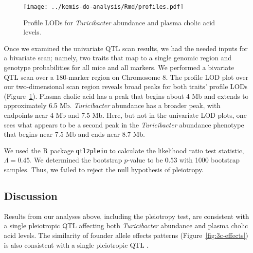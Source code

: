 \documentclass[oneside]{book}\usepackage[]{graphicx}\usepackage[]{color}
\begin{document}

\begin{figure}
\texttt{[image: ../kemis-do-analysis/Rmd/profiles.pdf]}
\caption{Profile LODs for \emph{Turicibacter} abundance and plasma cholic acid levels.}\label{fig:3c-profile}
\end{figure}

Once we examined the univariate QTL scan results, 
we had the needed inputs for a bivariate scan; namely, two traits that map to a single 
genomic region and genotype probabilities for all mice and all markers. 
We performed a bivariate QTL scan over a 180-marker region on Chromosome 8. 
The profile LOD plot over our two-dimensional scan region reveals broad peaks
for both traits' profile LODs (Figure~\ref{fig:3c-profile}). Plasma 
cholic acid has a peak that begins about 4 Mb and extends to 
approximately 6.5 Mb. \emph{Turicibacter} abundance has a broader peak, 
with endpoints near 4 Mb and 7.5 Mb. Here, but not in the univariate 
LOD plots, one sees what appears to be a second peak in the \emph{Turicibacter} 
abundance phenotype that begins near 7.5 Mb and ends near 8.7 Mb. 



We used the R package \texttt{qtl2pleio} \citep{qtl2pleio} to 
calculate the likelihood ratio test statistic, $\Lambda = 0.45$. We 
determined the bootstrap $p$-value to be $0.53$ with 1000 bootstrap 
samples. Thus, we failed to reject the null hypothesis of pleiotropy.


\subsection{Discussion}

Results from our analyses above, including the pleiotropy test, are consistent with a 
single pleiotropic QTL affecting both \emph{Turicibacter} abundance 
and plasma cholic acid levels. 
The similarity of founder allele effects patterns (Figure~\ref{fig:3c-effects}) is 
also consistent with a single pleiotropic QTL \citep{king2012genetic,macdonald2007joint}. 
\end{document}
